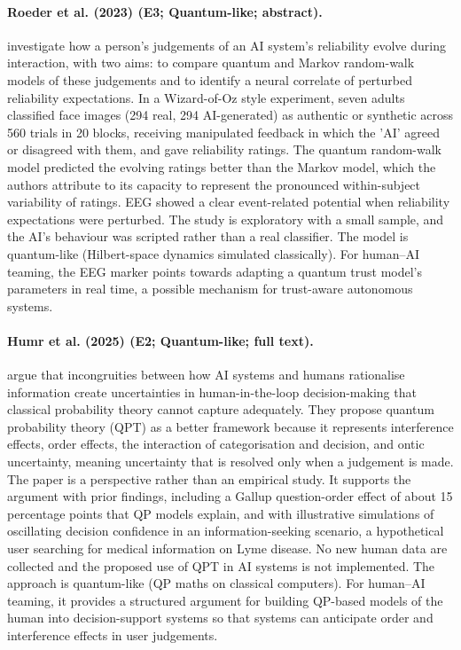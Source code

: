 \documentclass[10pt,a4paper]{article}
\begin{document}
\paragraph{Roeder et al. (2023) (E3; Quantum-like; abstract).} \citet{Roeder2023} investigate how a person's judgements of an AI system's reliability evolve during interaction, with two aims: to compare quantum and Markov random-walk models of these judgements and to identify a neural correlate of perturbed reliability expectations. In a Wizard-of-Oz style experiment, seven adults classified face images (294 real, 294 AI-generated) as authentic or synthetic across 560 trials in 20 blocks, receiving manipulated feedback in which the 'AI' agreed or disagreed with them, and gave reliability ratings. The quantum random-walk model predicted the evolving ratings better than the Markov model, which the authors attribute to its capacity to represent the pronounced within-subject variability of ratings. EEG showed a clear event-related potential when reliability expectations were perturbed. The study is exploratory with a small sample, and the AI's behaviour was scripted rather than a real classifier. The model is quantum-like (Hilbert-space dynamics simulated classically). For human--AI teaming, the EEG marker points towards adapting a quantum trust model's parameters in real time, a possible mechanism for trust-aware autonomous systems.

\paragraph{Humr et al. (2025) (E2; Quantum-like; full text).} \citet{Humr2025} argue that incongruities between how AI systems and humans rationalise information create uncertainties in human-in-the-loop decision-making that classical probability theory cannot capture adequately. They propose quantum probability theory (QPT) as a better framework because it represents interference effects, order effects, the interaction of categorisation and decision, and ontic uncertainty, meaning uncertainty that is resolved only when a judgement is made. The paper is a perspective rather than an empirical study. It supports the argument with prior findings, including a Gallup question-order effect of about 15 percentage points that QP models explain, and with illustrative simulations of oscillating decision confidence in an information-seeking scenario, a hypothetical user searching for medical information on Lyme disease. No new human data are collected and the proposed use of QPT in AI systems is not implemented. The approach is quantum-like (QP maths on classical computers). For human--AI teaming, it provides a structured argument for building QP-based models of the human into decision-support systems so that systems can anticipate order and interference effects in user judgements.
\end{document}
